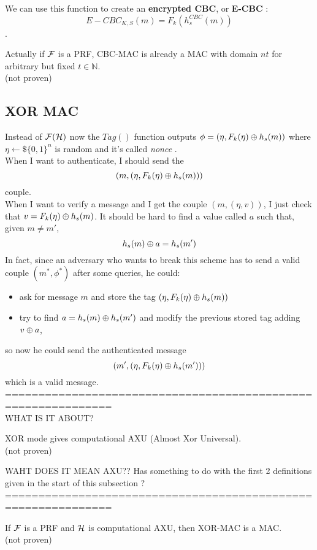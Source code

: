 We can use this function to create an \textbf{encrypted CBC}, or \textbf{E-CBC}  :
\[
    E-CBC_{K, S}(m)=F_{k}(h_{s}^{CBC}(m))
\]
.
\begin{theorem}
    Actually if $\mathcal{F}$ is a PRF, CBC-MAC is already a MAC with domain $nt$ for
    arbitrary but fixed $t \in \mathbb{N} $.\\
    (not proven)
\end{theorem}

\subsection{XOR MAC}
Instead of $\mathcal{F}(\mathcal{H})$ now the $Tag()$ function outputs $\phi = (\eta , F_{k}(\eta)
\oplus h_{s}(m))$ where $\eta \leftarrow\$ \{0,1\}^{n}$ is random and it's called
\textit{nonce} .\\
When I want to authenticate, I should send the
\[
    (m,( \eta, F_{k}(\eta)\oplus h_{s}(m)))
\]
couple.\\
When I want to verify a message and I get the couple $(m, (\eta, v))$, I just
check that $v=F_{k}(\eta) \oplus h_{s}(m)$. It should be hard to find a value
called $a$ such that, given $m \not= m'$, 
\[
    h_{s}(m) \oplus a= h_{s}(m')
\]
In fact, since an adversary who wants to break this scheme has to send a valid
couple $(m^{*}, \phi^{*})$ after some queries, he could:
\begin{itemize}
    \item ask for message $m$ and store the tag $( \eta, F_{k}(\eta)\oplus h_{s}(m))$
    \item try to find $a=h_{s}(m) \oplus h_{s}(m')$ and modify the previous stored
        tag adding $v \oplus a$, 
\end{itemize}
so now he could send the authenticated message
\[
    (m', (\eta, F_{k}(\eta) \oplus h_{s}(m'))) 
\]
which is a valid message.\\

==============================================================\\
WHAT IS IT ABOUT?
\begin{lemma}
    XOR mode gives computational AXU (Almost Xor Universal).\\
    (not proven)
\end{lemma}
WAHT DOES IT MEAN AXU?? Has something to do with the first 2 definitions given
in the start of this subsection ?
==============================================================\\

\begin{theorem}
    If $\mathcal{F}$ is a PRF and $\mathcal{H}$ is computational AXU, then XOR-MAC is a MAC.\\
    (not proven)
\end{theorem}

